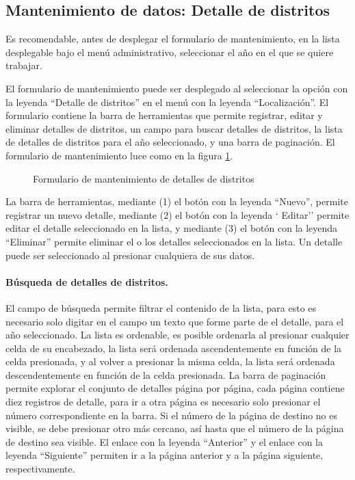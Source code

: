 \documentclass[a4paper, 9pt, conference]{article}              %
\begin{document}
\subsection{Mantenimiento de datos: Detalle de distritos}
Es recomendable, antes de desplegar el formulario de mantenimiento, en la lista desplegable bajo el men\'u administrativo, seleccionar el a\~no en el que se quiere trabajar.

El formulario de mantenimiento puede ser desplegado al seleccionar la opci\'on con la leyenda ``Detalle de distritos'' en el men\'u con la leyenda ``Localizaci\'on''. El formulario contiene la barra de herramientas que permite registrar, editar y eliminar detalles de distritos, un campo para buscar detalles de distritos, la lista de detalles de distritos para el a\~no seleccionado, y una barra de paginaci\'on. El formulario de mantenimiento luce como en la figura \ref{fig:geodistrictsdetail}.

\begin{figure}
	\centering
		\caption{Formulario de mantenimiento de detalles de distritos}
	\label{fig:geodistrictsdetail}
\end{figure}

La barra de herramientas, mediante (1) el bot\'on con la leyenda ``Nuevo'', permite registrar un nuevo detalle, mediante (2) el bot\'on con la leyenda ` Editar'' permite editar el detalle seleccionado en la lista, y mediante (3) el bot\'on con la leyenda ``Eliminar'' permite eliminar el o los detalles seleccionados en la lista. Un detalle puede ser seleccionado al presionar cualquiera de sus datos.

\paragraph{B\'usqueda de detalles de distritos.}

El campo de b\'usqueda permite filtrar el contenido de la lista, para esto es necesario solo digitar en el campo un texto que forme parte de el detalle, para el a\~no seleccionado. La lista es ordenable, es posible ordenarla al presionar cualquier celda de su encabezado, la lista ser\'a ordenada ascendentemente en funci\'on de la celda presionada, y al volver a presionar la misma celda, la lista ser\'a ordenada descendentemente en funci\'on de la celda presionada. La barra de paginaci\'on permite explorar el conjunto de detalles p\'agina por p\'agina, cada p\'agina contiene diez registros de detalle, para ir a otra p\'agina es necesario solo presionar el n\'umero correspondiente en la barra. Si el n\'umero de la p\'agina de destino no es visible, se debe presionar otro m\'as cercano, as\'i hasta que el n\'umero de la p\'agina de destino sea visible. El enlace con la leyenda ``Anterior'' y el enlace con la leyenda ``Siguiente'' permiten ir a la p\'agina anterior y a la p\'agina siguiente, respectivamente.
\end{document}
